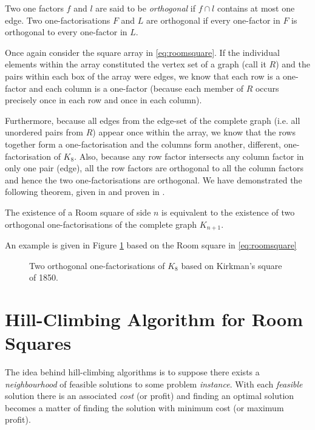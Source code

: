 Two one factors $f$ and $l$ are said to be \emph{orthogonal} if $f \cap l$ contains at most one edge.
Two one-factorisations $F$ and $L$ are orthogonal if every one-factor in $F$ is orthogonal to every one-factor in $L$.

Once again consider the square array in \eqref{eq:roomsquare}.
If the individual elements within the array constituted the vertex set of a graph (call it $R$) and the pairs within each box of the array were edges, we know that each row is a one-factor and each column is a one-factor (because each member of $R$ occurs precisely once in each row and once in each column).

Furthermore, because all edges from the edge-set of the complete graph (i.e. all unordered pairs from $R$) appear once within the array, we know that the rows together form a one-factorisation and the columns form another, different, one-factorisation of $K_8$.
Also, because any row factor intersects any column factor in only one pair (edge), all the row factors are orthogonal to all the column factors and hence the two one-factorisations are orthogonal.
We have demonstrated the following theorem, given in
\cite{dinitzContemporaryDesignTheory1992}
and proven in
\cite{nemethStudyRoomSquares1969}.

\begin{theorem}
The existence of a Room square of side $n$ is equivalent to the existence of two orthogonal one-factorisations of the complete graph $K_{n+1}$.
\end{theorem}

An example is given in Figure \ref{fig:kirkmans-square} based on the Room square in \eqref{eq:roomsquare}

\begin{figure}
  \centering
  
  \caption{Two orthogonal one-factorisations of $K_{8}$ based on Kirkman's square of 1850.}
  \label{fig:kirkmans-square}
\end{figure}

\section{Hill-Climbing Algorithm for Room Squares}

The idea behind hill-climbing algorithms is to suppose there exists a \emph{neighbourhood} of feasible solutions to some problem \emph{instance}.
With each \emph{feasible} solution there is an associated \emph{cost} (or profit) and finding an optimal solution becomes a matter of finding the solution with minimum cost (or maximum profit).

